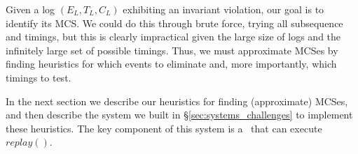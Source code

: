 Given a log $(E_L, T_L, C_L)$ exhibiting an invariant violation,
our goal is to identify its MCS. We could do this through brute force, trying
all subsequence and timings, but this is clearly impractical given the large size of logs and the
infinitely large set of possible timings. Thus, we must approximate MCSes by finding heuristics
for which events to eliminate and, more importantly, which timings to test.

In the next section we describe our heuristics for finding (approximate) MCSes, and then
describe the system we built in \S\ref{sec:systems_challenges} to implement these heuristics.
The key component of this system is a \tester~that can execute $replay()$.
